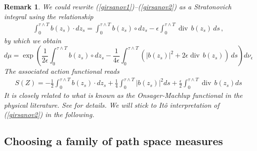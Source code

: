 \documentclass[final]{siamltex}
\newcommand{\eps}{\epsilon}
\newtheorem{remark}{Remark}
\begin{document}
\begin{remark}
  We could rewrite (\ref{girsanov1})--(\ref{girsanov2}) as a Stratonovich integral using the relationship
\begin{align}
  \int_0^{\tau\wedge T} b(z_s)\cdot dz_s = \int_0^{\tau\wedge T} b(z_s) \circ dz_s - \eps  \int_0^{\tau\wedge T} \operatorname{div}\,b(z_s)\,ds\,,
\end{align}
by which we obtain 
\begin{equation}\label{girsanov3}
  {d\mu} =\exp\left(\frac{1}{2\eps}\int_0^{\tau\wedge T} b(z_s)\circ dz_s -
  \frac{1}{4\eps}\int_0^{\tau\wedge T} (|b(z_s)|^2 + 2\eps \operatorname{div}\,b(z_s))\,ds\right)d\nu_{\eps} \,
\end{equation}
The associated action functional reads
\begin{align}
  S(Z)= -\frac{1}{2}\int_0^{\tau\wedge T} b(z_s)\cdot dz_s +
  \frac{1}{4}\int_0^{\tau\wedge T} |b(z_s)|^2ds +
  \frac{\eps}{2}  \int_0^{\tau\wedge T} \operatorname{div}\,b(z_{s}) ds
  \label{om-fun}
\end{align}
It is closely related to what is known as the \emph{Onsager-Machlup functional} in the physical literature. See \cite{om1978,
om_functional_pinski} for details. We will stick to It\^o interpretation of (\ref{girsanov2}) in the
following.
\end{remark}
%


\subsection{Choosing a family of path space measures}
\label{subsec-om-functional}
\end{document}
